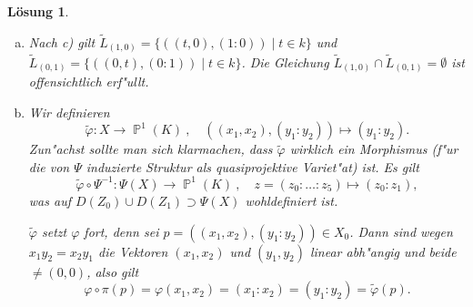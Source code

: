 \documentclass[a4paper, 12pt, numbers=noendperiod, chapterprefix=true]{scrbook}
\theoremstyle{break}
\newtheorem{Loes}{L\"osung}
\theoremstyle{nonumberbreak}
\theoremstyle{nonumberplain}
\newcommand{\quot}[1]{\textrm{\glqq}{#1}\textrm{\grqq}}
\DeclareMathOperator{\Bild}{Bild}
\newcommand{\A}{\mathbb{A}}
\newcommand{\Affine}{\mathbb{A}} %
\DeclareMathOperator{\Projective}{\mathbb{P}} %
\begin{document}
\begin{Loes}
\begin{enumerate}[a)]
	\emph{Behauptung}: $\Bild(\Psi \circ h) = \Psi(X) \cap V(v_1Z_1-v_2Z_0)$ (daraus folgt dann insbesondere, dass $\Bild (\Psi \circ h)$ abgeschlossen ist).
 
	\emph{Beweis der Behauptung}:  Die Inklusion \quot{$\subseteq$} ist klar. Sei umgekehrt $z \in \Psi(X) \cap V(v_1Z_1-v_2Z_0)$. Dann sind $(v_1, v_2)$ und $(z_0, z_1)$ linear abh"angig und wegen a) gilt $z = (z_0:z_1:\tau z_0^2 : \tau z_0z_1: \tau z_0z_1:\tau z_1^2)$ mit $\tau \in k$ geeignet. Damit liegt $z$ in $\Bild(\Psi \circ h)$.
 
	Es gilt $\Psi(\pi^{-1}(L_v\setminus \{(0,0)\})) = (\Psi \circ \sigma)(L_v\setminus \{(0,0)\}) = \{(v_0:v_1:tv_0^2:t v_0v_1:tv_0v_1:tv_1^2) \mid t \in k\}$. Somit ist $\Bild(\Psi \circ h) = \Psi(\pi^{-1}(L_v\setminus \{(0,0)\})) \cup \{(v_0:v_1:0:0:0:0)\}$ und weil $\Bild(\Psi \circ h)$ irreduzibel ist und $\{(v_0:v_1:0:0:0:0)\}$ abgeschlossen, muss $\Psi(\pi^{-1}(L_v\setminus \{(0,0)\}))$ offen sein. Da $\Bild(\Psi \circ h)$ abgeschlossen ist folgt $\Psi(\widetilde{L_v}) = \Bild(\psi \circ h) = \Psi(H)$.
 
	Es bleibt zu folgern, dass f"ur alle $p \in E = \pi^{-1}((0,0))$ ein $M \subseteq X_0$ existiert mit $p \in \overline M$:\\
	Sei $((0,0),[v]) \in E$, also $v \in \Affine^2(k) \setminus \{(0,0)\}$. Dann ist $\widetilde{L_v} \cap E = \{(v_0\colon v_1 \colon 0 \colon 0 \colon 0 \colon 0)\} \stackrel{\Psi^{-1}}{\rightarrow} \{((0,0),[v])\}$, also ist $((0,0),[v])$ im Abschluss von $\pi^{-1}(L_v \setminus\{(0,0)\})$ enthalten und $\pi^{-1}(L_v \setminus\{(0,0)\}) \subseteq X_0$. 
\item
	Nach c) gilt $\widetilde{L}_{(1,0)} = \{((t,0),(1:0)) \mid t \in k\}$ und $\widetilde{L}_{(0,1)} = \{((0,t),(0:1)) \mid t \in k\}$. Die Gleichung $\widetilde{L}_{(1,0)} \cap \widetilde{L}_{(0,1)} = \emptyset$ ist offensichtlich erf"ullt.
\item
	Wir definieren
		\[\tilde\varphi: X\to \Projective^1(K)\ ,\quad ((x_1,x_2),(y_1:y_2)) \mapsto (y_1:y_2).\]
	Zun"achst sollte man sich klarmachen, dass $\tilde\varphi$ wirklich ein Morphismus (f"ur die von $\Psi$ induzierte Struktur als quasiprojektive Variet"at) ist. Es gilt
		\[\tilde\varphi \circ \Psi^{-1}: \Psi(X)\to\Projective^1(K)\ ,\quad z = (z_0:\ldots:z_5)\mapsto (z_0:z_1),\]
	was auf $D(Z_0)\cup D(Z_1)\supset \Psi(X)$ wohldefiniert ist.
	
	$\tilde\varphi$ setzt $\varphi$ fort, denn sei $p = ((x_1,x_2), (y_1:y_2))\in X_0$. Dann sind wegen $x_1y_2 = x_2y_1$ die Vektoren $(x_1,x_2)$ und $(y_1,y_2)$ linear abh"angig und beide $\neq (0,0)$, also gilt
		\[\varphi\circ \pi(p) = \varphi(x_1,x_2) = (x_1:x_2) = (y_1:y_2) = \tilde\varphi(p).\]
\end{enumerate}\end{Loes}
\end{document}

